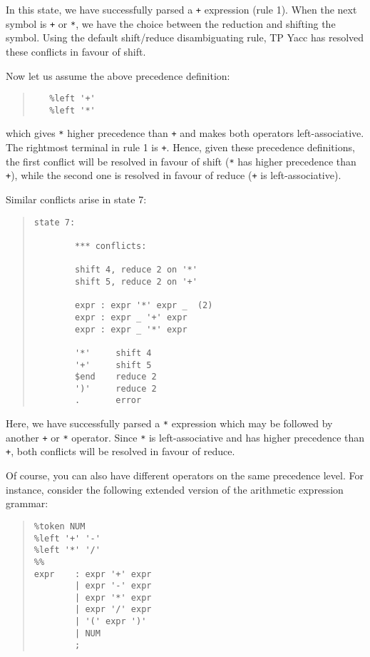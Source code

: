 In this state, we have successfully parsed a \verb"+" expression (rule 1).
When the next symbol is \verb"+" or \verb"*", we have the choice between the
reduction and shifting the symbol. Using the default shift/reduce
disambiguating rule, TP Yacc has resolved these conflicts in favour of shift.

Now let us assume the above precedence definition:
\begin{quote}\begin{verbatim}
   %left '+'
   %left '*'
\end{verbatim}\end{quote}
which gives \verb"*" higher precedence than \verb"+" and makes both operators
left-associative. The rightmost terminal in rule 1 is \verb"+". Hence, given
these precedence definitions, the first conflict will be resolved in favour
of shift (\verb"*" has higher precedence than \verb"+"), while the second one
is resolved in favour of reduce (\verb"+" is left-associative).

Similar conflicts arise in state 7:

\begin{quote}\begin{verbatim}
state 7:

        *** conflicts:

        shift 4, reduce 2 on '*'
        shift 5, reduce 2 on '+'

        expr : expr '*' expr _  (2)
        expr : expr _ '+' expr
        expr : expr _ '*' expr

        '*'     shift 4
        '+'     shift 5
        $end    reduce 2
        ')'     reduce 2
        .       error
\end{verbatim}\end{quote}

Here, we have successfully parsed a \verb"*" expression which may be followed
by another \verb"+" or \verb"*" operator. Since \verb"*" is left-associative
and has higher precedence than \verb"+", both conflicts will be resolved in
favour of reduce.

Of course, you can also have different operators on the same precedence
level. For instance, consider the following extended version of the
arithmetic expression grammar:

\begin{quote}\begin{verbatim}
%token NUM
%left '+' '-'
%left '*' '/'
%%
expr    : expr '+' expr
        | expr '-' expr
        | expr '*' expr
        | expr '/' expr
        | '(' expr ')'
        | NUM
        ;
\end{verbatim}\end{quote}

